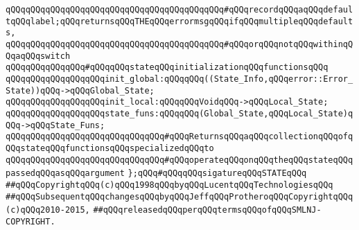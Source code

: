 \verb|qQQqqQQqqQQqqQQqqQQqqQQqqQQqqQQqqQQqqQQqqQQq#qQQqrecordqQQqaqQQqdefaultqQQqlabel;qQQqreturnsqQQqTHEqQQqerrormsgqQQqifqQQqmultipleqQQqdefaults,|\newline
\verb|qQQqqQQqqQQqqQQqqQQqqQQqqQQqqQQqqQQqqQQqqQQq#qQQqorqQQqnotqQQqwithinqQQqaqQQqswitch|\newline
\newline
\verb|qQQqqQQqqQQqqQQq#qQQqqQQqstateqQQqinitializationqQQqfunctionsqQQq|\newline
\verb|qQQqqQQqqQQqqQQqqQQqinit_global:qQQqqQQq((State_Info,qQQqerror::Error_State))qQQq->qQQqGlobal_State;|\newline
\verb|qQQqqQQqqQQqqQQqqQQqinit_local:qQQqqQQqVoidqQQq->qQQqLocal_State;|\newline
\newline
\verb|qQQqqQQqqQQqqQQqqQQqstate_funs:qQQqqQQq(Global_State,qQQqLocal_State)qQQq->qQQqState_Funs;|\newline
\verb|qQQqqQQqqQQqqQQqqQQqqQQqqQQqqQQq#qQQqReturnsqQQqaqQQqcollectionqQQqofqQQqstateqQQqfunctionsqQQqspecializedqQQqto|\newline
\verb|qQQqqQQqqQQqqQQqqQQqqQQqqQQqqQQq#qQQqoperateqQQqonqQQqtheqQQqstateqQQqpassedqQQqasqQQqargument|\newline
\newline
\verb|};qQQq#qQQqqQQqsigatureqQQqSTATEqQQq|\newline
\newline
\newline
\verb|##qQQqCopyrightqQQq(c)qQQq1998qQQqbyqQQqLucentqQQqTechnologiesqQQq|\newline
\verb|##qQQqSubsequentqQQqchangesqQQqbyqQQqJeffqQQqProtheroqQQqCopyrightqQQq(c)qQQq2010-2015,|\newline
\verb|##qQQqreleasedqQQqperqQQqtermsqQQqofqQQqSMLNJ-COPYRIGHT.|\newline

